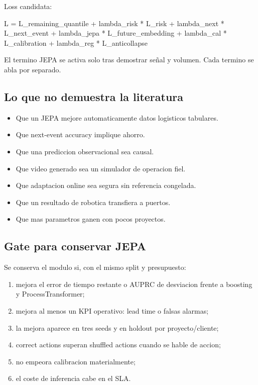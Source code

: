 \documentclass[
  spanish,
  10pt,
  a4paper,
]{article}
\newenvironment{Shaded}{}{}
\newcommand{\NormalTok}[1]{#1}
\providecommand{\tightlist}{%
  \setlength{\itemsep}{0pt}\setlength{\parskip}{0pt}}
\begin{document}
Loss candidata:

\begin{Shaded}
\begin{Highlighting}[]
\NormalTok{L = L\_remaining\_quantile}
\NormalTok{  + lambda\_risk * L\_risk}
\NormalTok{  + lambda\_next * L\_next\_event}
\NormalTok{  + lambda\_jepa * L\_future\_embedding}
\NormalTok{  + lambda\_cal * L\_calibration}
\NormalTok{  + lambda\_reg * L\_anticollapse}
\end{Highlighting}
\end{Shaded}

El termino JEPA se activa solo tras demostrar señal y volumen. Cada
termino se abla por separado.

\subsection{Lo que no demuestra la
literatura}\label{lo-que-no-demuestra-la-literatura}

\begin{itemize}
\tightlist
\item
  Que un JEPA mejore automaticamente datos logisticos tabulares.
\item
  Que next-event accuracy implique ahorro.
\item
  Que una prediccion observacional sea causal.
\item
  Que video generado sea un simulador de operacion fiel.
\item
  Que adaptacion online sea segura sin referencia congelada.
\item
  Que un resultado de robotica transfiera a puertos.
\item
  Que mas parametros ganen con pocos proyectos.
\end{itemize}

\subsection{Gate para conservar JEPA}\label{gate-para-conservar-jepa}

Se conserva el modulo si, con el mismo split y presupuesto:

\begin{enumerate}
\def\labelenumi{\arabic{enumi}.}
\tightlist
\item
  mejora el error de tiempo restante o AUPRC de desviacion frente a
  boosting y ProcessTransformer;
\item
  mejora al menos un KPI operativo: lead time o falsas alarmas;
\item
  la mejora aparece en tres seeds y en holdout por proyecto/cliente;
\item
  correct actions superan shuffled actions cuando se hable de accion;
\item
  no empeora calibracion materialmente;
\item
  el coste de inferencia cabe en el SLA.
\end{enumerate}
\end{document}
